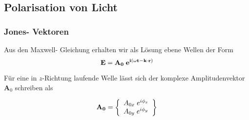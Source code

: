 \documentclass[a4paper,oneside]{article}
\begin{document}
\subsection{Polarisation von Licht}
\subsubsection{Jones- Vektoren}
Aus den Maxwell- Gleichung erhalten wir als Lösung ebene Wellen der Form
\begin{equation}
 \bf{E}=\bf{A_0}\;e^{i(\omega t-\bf{k}\cdot\bf{r})}
\end{equation}

Für eine in $z$-Richtung laufende Welle lässt sich der komplexe Amplitudenvektor $\textbf{A}_0$ schreiben als



$$ \bf{A_0} = \left\{ \begin{array}{l}
A_{0x}\;e^{i\phi_x} \\
A_{0y}\;e^{i\phi_y}
\end{array} \right\} $$
\end{document}

